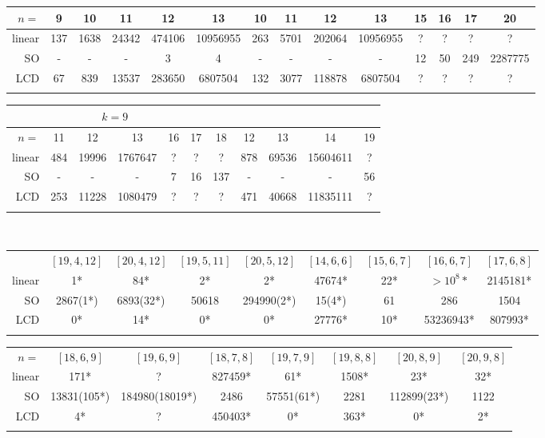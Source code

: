 \documentclass[a4paper,11pt]{article}
\begin{document}
\begin{table}
{\begin{tabular}{r|c|c|c|c|c|c|c|c|c|c|c|c|c}
\hline
$n=$    & 9 & 10& 11 &  12& 13&10& 11 &  12& 13 & 15& 16& 17&20 \\
\hline
linear &	137&	1638&	24342&	474106&	10956955&263&	5701&	202064&	10956955&	?&	?&	?&?	\\
SO &-&	-&	-&	3&	4&	-&		-&	-&	-&	12&	50&	249&	2287775\\
LCD &	67&	839&	13537&	283650&	6807504&132&	3077&	118878&	6807504&	?&	?&	?&?	\\
\noalign{\smallskip}\hline
\end{tabular}
\begin{tabular}{r|c|c|c|c|c|c|c|c|c|c}
\hline\noalign{\smallskip}
\multicolumn{7}{c|}{$k=8$}& \multicolumn{4}{c}{$k=9$}\\
\hline
$n=$    &  11 &  12& 13& 16& 17& 18& 12& 13& 14& 19\\
\hline
linear &	484&	19996&	1767647&	?&	?&	?&	878	&69536&	15604611&	?\\
SO &-&		-&	-&	7&	16&	137&-&		-&	-&	56\\	
LCD &	253&	11228&	1080479&	?&	?&	?&	471&	40668&	11835111&	?\\
\noalign{\smallskip}\hline
\end{tabular}\\
\begin{tabular}{r|c|c|c|c|c|c|c|c}
\hline\noalign{\smallskip}
\multicolumn{9}{c}{Optimal codes} \\
\hline
    & $[19,4,12]$& $[20,4,12]$& $[19,5,11]$& $[20,5,12]$& $[14,6,6]$& $[15,6,7]$& $[16,6,7]$& $[17,6,8]$ \\
\hline
linear&	1*&	84*&	2*&	2*&	47674*&	22*&	$>10^8*$&2145181*\\
SO &2867(1*)&	6893(32*)&	50618&	294990(2*)&	15(4*)&	61&	286&	1504	\\
LCD &	0*&	14*&	0*&	0*&	27776*&	10*&	53236943*&	807993*	\\
\noalign{\smallskip}\hline
\end{tabular}
\begin{tabular}{r|c|c|c|c|c|c|c}
\hline\noalign{\smallskip}
\multicolumn{8}{c}{Optimal codes} \\
\hline
$n=$     & $[18,6,9]$& $[19,6,9]$ & $[18,7,8]$& $[19,7,9]$&  $[19,8,8]$& $[20,8,9]$ & $[20,9,8]$\\
\hline
linear &	171*&	?&	827459*&	61*&	1508*&	23*&	32*\\
SO &	13831(105*)&	184980(18019*)&	2486&	57551(61*)&2281&	112899(23*)&	1122\\
LCD &	4*&	?&	450403*&	0*&		363*&	0*&	2*\\
\noalign{\smallskip}\hline
\end{tabular}
}
\end{table}
\end{document}
